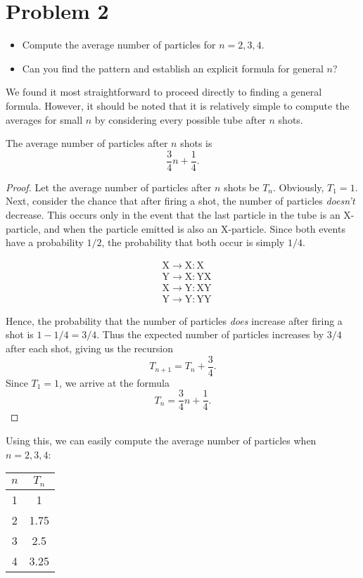 \section{Problem 2}

\begin{itemize}
  \item Compute the average number of particles for $n = 2, 3, 4$.
  \item Can you find the pattern and establish an explicit formula for general $n$?
\end{itemize}

We found it most straightforward to proceed directly to finding a general formula. However, it should be noted that it is relatively simple to compute the averages for small $n$ by considering every possible tube after $n$ shots.

\begin{theorem}\label{thm:2}
  The average number of particles after $n$ shots is \[
  \frac{3}{4}n + \frac{1}{4}
  .\]
\end{theorem}
\begin{proof}
  Let the average number of particles after $n$ shots be $T_n$. Obviously, $T_1 = 1$. Next, consider the chance that after firing a shot, the number of particles \emph{doesn't} decrease. This occurs only in the event that the last particle in the tube is an X-particle, and when the particle emitted is also an X-particle. Since both events have a probability $1 / 2$, the probability that both occur is simply $1 / 4$. 
  \begin{figure}[H]
    \vspace{-1.5em}
    \begin{align*}
    &\text{X} \to \text{X}: \text{X} \\
    &\text{Y} \to \text{X}: \text{YX} \\
    &\text{X} \to \text{Y}: \text{XY} \\
    &\text{Y} \to \text{Y}: \text{YY}
    \end{align*}
    \vspace{-3em}
  \end{figure}
  Hence, the probability that the number of particles \emph{does} increase after firing a shot is $1 -1 / 4 = 3 / 4$. Thus the expected number of particles increases by $3 / 4$ after each shot, giving us the recursion \[
    T_{n+1} = T_{n} + \frac{3}{4}
  .\] Since $T_1 = 1$, we arrive at the formula \[
    T_{n} = \frac{3}{4}n + \frac{1}{4} \tag*{\qedhere}
  .\] 
\end{proof}

Using this, we can easily compute the average number of particles when $n = 2, 3, 4$:
\begin{table}[H]
  \centering
  \begin{tabular}{cc}
    \toprule
    $n$ & $T_n$ \\
    \midrule
    1 & 1 \\
    2 & 1.75 \\
    3 & 2.5 \\
    4 & 3.25 \\
    \bottomrule
  \end{tabular}
\end{table}

